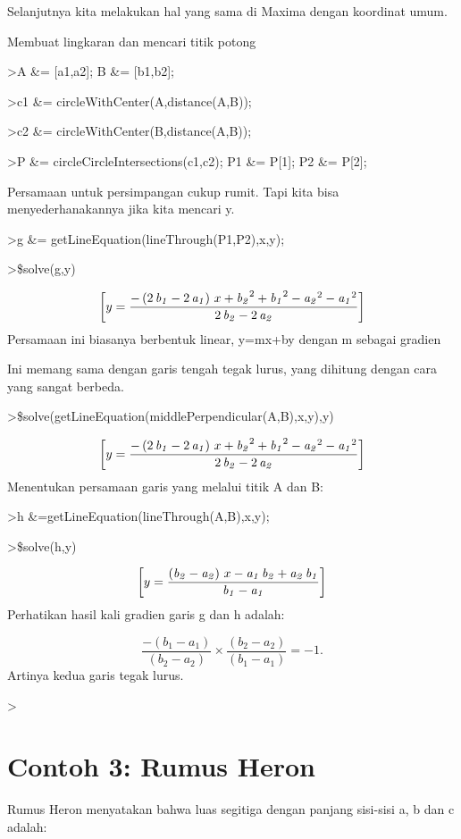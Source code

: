 \documentclass[
]{book}
\begin{document}
Selanjutnya kita melakukan hal yang sama di Maxima dengan koordinat umum.

Membuat lingkaran dan mencari titik potong

\textgreater A \&= {[}a1,a2{]}; B \&= {[}b1,b2{]};

\textgreater c1 \&= circleWithCenter(A,distance(A,B));

\textgreater c2 \&= circleWithCenter(B,distance(A,B));

\textgreater P \&= circleCircleIntersections(c1,c2); P1 \&= P{[}1{]}; P2 \&= P{[}2{]};

Persamaan untuk persimpangan cukup rumit. Tapi kita bisa menyederhanakannya jika kita mencari y.

\textgreater g \&= getLineEquation(lineThrough(P1,P2),x,y);

\textgreater\$solve(g,y)

\[\left[ y=\frac{-\left(2\,{\it b_1}-2\,{\it a_1}\right)\,x+{\it b_2}  ^2+{\it b_1}^2-{\it a_2}^2-{\it a_1}^2}{2\,{\it b_2}-2\,{\it a_2}}   \right] \]Persamaan ini biasanya berbentuk linear, y=mx+by dengan m sebagai gradien

Ini memang sama dengan garis tengah tegak lurus, yang dihitung dengan cara yang sangat berbeda.

\textgreater\$solve(getLineEquation(middlePerpendicular(A,B),x,y),y)

\[\left[ y=\frac{-\left(2\,{\it b_1}-2\,{\it a_1}\right)\,x+{\it b_2}  ^2+{\it b_1}^2-{\it a_2}^2-{\it a_1}^2}{2\,{\it b_2}-2\,{\it a_2}}   \right] \]Menentukan persamaan garis yang melalui titik A dan B:

\textgreater h \&=getLineEquation(lineThrough(A,B),x,y);

\textgreater\$solve(h,y)

\[\left[ y=\frac{\left({\it b_2}-{\it a_2}\right)\,x-{\it a_1}\,  {\it b_2}+{\it a_2}\,{\it b_1}}{{\it b_1}-{\it a_1}} \right] \]Perhatikan hasil kali gradien garis g dan h adalah:

\[\frac{-(b_1-a_1)}{(b_2-a_2)}\times \frac{(b_2-a_2)}{(b_1-a_1)} = -1.\]Artinya kedua garis tegak lurus.

\textgreater{}

\chapter{Contoh 3: Rumus Heron}\label{contoh-3-rumus-heron}

Rumus Heron menyatakan bahwa luas segitiga dengan panjang sisi-sisi a, b dan c adalah:
\end{document}
